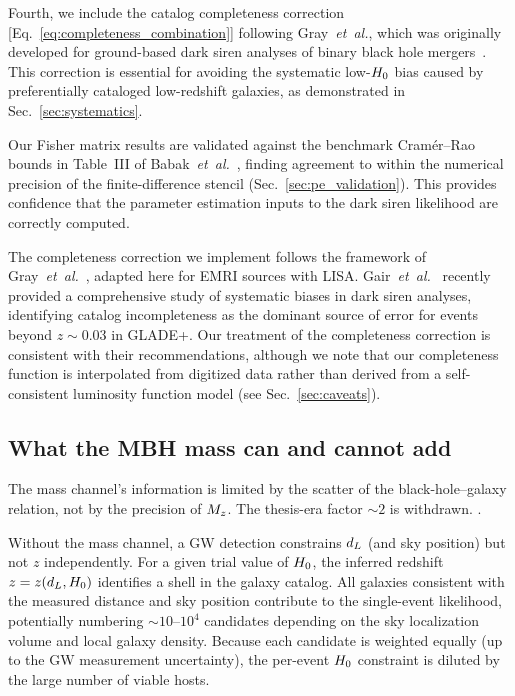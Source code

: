 Fourth, we include the catalog completeness correction
[Eq.~\eqref{eq:completeness_combination}] following Gray~\emph{et~al.},
which was originally developed for ground-based dark siren analyses of
binary black hole mergers~\cite{Gray:2019ksv}.  This correction is
essential for avoiding the systematic low-$H_0$ bias caused by
preferentially cataloged low-redshift galaxies, as demonstrated in
Sec.~\ref{sec:systematics}.

Our Fisher matrix results are validated against the benchmark
Cram\'{e}r--Rao bounds in Table~III of
Babak~\emph{et~al.}~\cite{Babak:2017tow}, finding agreement to within
the numerical precision of the finite-difference stencil
(Sec.~\ref{sec:pe_validation}).  This provides confidence that the
parameter estimation inputs to the dark siren likelihood are correctly
computed.

The completeness correction we implement follows the framework of
Gray~\emph{et~al.}~\cite{Gray:2019ksv}, adapted here for EMRI sources
with LISA.  Gair~\emph{et~al.}~\cite{Gair:2022zsa} recently provided a
comprehensive study of systematic biases in dark siren analyses,
identifying catalog incompleteness as the dominant source of error for
events beyond $z \sim 0.03$ in GLADE+.  Our treatment of the
completeness correction is consistent with their recommendations,
although we note that our completeness function is interpolated from
digitized data rather than derived from a self-consistent luminosity
function model (see Sec.~\ref{sec:caveats}).

\subsection{What the MBH mass can and cannot add}
\label{sec:mass_interpretation}

The mass channel's information is limited by the scatter of the
black-hole--galaxy relation, not by the precision of $M_z$. The
thesis-era factor $\sim 2$ is withdrawn.
.

Without the mass channel, a GW detection constrains $d_L$ (and sky
position) but not $z$ independently.  For a given trial value of $H_0$,
the inferred redshift $z = z(d_L, H_0)$ identifies a shell in the galaxy
catalog.  All galaxies consistent with the measured distance and sky
position contribute to the single-event likelihood, potentially
numbering $\sim 10$--$10^4$ candidates depending on the sky
localization volume and local galaxy density.  Because each candidate is
weighted equally (up to the GW measurement uncertainty), the per-event
$H_0$ constraint is diluted by the large number of viable hosts.

